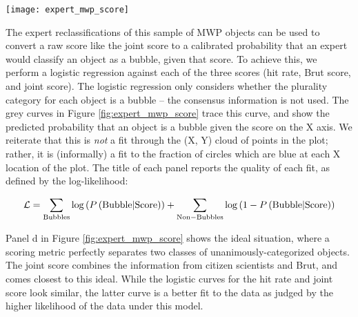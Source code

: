 \documentclass[preprint]{aastex}
\begin{document}
\begin{figure*}
\texttt{[image: expert\_mwp\_score]}
\caption{The ability for the MWP hit rate and Brut score to predict expert classifications for objects in the MWP catalog. Each circle represents one of the 41 objects in the MWP catalog shown to experts. Color depicts the most popular classification, and the y-position indicates the fraction of experts who chose this category. The curves estimate the bubble probability (right Y axis), obtained via logistic regression to the object category. The Joint metric, which combines the Hit Rate and Brut score, is best able to predict expert classifications. The title reports the log-likelihood of each logistic fit, according to Equation \ref{eq:likelihood}. Panel d depicts the ideal situation, where classes are unambiguous.}
\label{fig:expert_mwp_score}
\end{figure*}

The expert reclassifications of this sample of MWP objects can be used to convert a raw score like the joint score to a calibrated probability that an expert would classify an object as a bubble, given that score. To achieve this, we perform a logistic regression against each of the three scores (hit rate, Brut score, and joint score). The logistic regression only considers whether the plurality category for each object is a bubble -- the consensus information is not used. The grey curves in Figure \ref{fig:expert_mwp_score} trace this curve, and show the predicted probability that an object is a bubble given the score on the X axis. We reiterate that this is \emph{not} a fit through the (X, Y) cloud of points in the plot; rather, it is (informally) a fit to the fraction of circles which are blue at each X location of the plot. The title of each panel reports the quality of each fit, as defined by the log-likelihood:

\begin{equation}
\mathcal{L} = \sum_{\rm Bubbles} \log\left(P\left({\rm Bubble | Score}\right)\right) + \sum_{\rm Non-Bubbles} \log\left(1 - P\left({\rm Bubble | Score}\right)\right)
\label{eq:likelihood}
\end{equation}

Panel d in Figure \ref{fig:expert_mwp_score} shows the ideal situation, where a scoring metric perfectly separates two classes of unanimously-categorized objects. The joint score combines the information from citizen scientists and Brut, and comes closest to this ideal. While the logistic curves for the hit rate and joint score look similar, the latter curve is a better fit to the data as judged by the higher likelihood of the data under this model.
\end{document}
